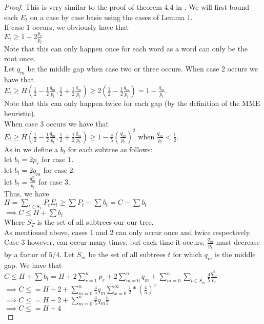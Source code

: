 \documentclass[letterpaper,12pt,titlepage,oneside,final]{book}
\theoremstyle{plain}
\begin{document}
\begin{proof}
This is very similar to the proof of theorem 4.4 in \cite{bayer1975improved}.
We will first bound each $E_t$ on a case by case basis using the cases of Lemma 1.\\
If case 1 occurs, we obviously have that \\
$E_t \geq 1-2 \frac{p_r}{p_t}$ \\
Note that this can only happen once for each word as a word can only be the root once. \\

Let $q_m$ be the middle gap when case two or three occurs. When case 2 occurs we have that \\
$E_t \geq H(\frac{1}{2}-\frac{1}{2} \frac{q_m}{p_t}, \frac{1}{2} + \frac{1}{2} \frac{q_m}{p_t}) \geq 2(\frac{1}{2}-\frac{1}{2} \frac{q_m}{p_t})=1-\frac{q_m}{p_t}$. \\
Note that this can only happen twice for each gap (by the definition of the MME heuristic). \\

When case 3 occurs we have that \\
$E_t \geq H(\frac{1}{2}-\frac{1}{2} \frac{q_m}{p_t}, \frac{1}{2} + \frac{1}{2} \frac{q_m}{p_t}) \geq 1- \frac{4}{5} (\frac{q_m}{p_t})^2$ when $\frac{q_m}{p_t} < \frac{1}{2}$. \\

As in \cite{bayer1975improved} we define a $b_t$ for each subtree as follows: \\
let $b_t=2p_r$ for case 1. \\
let $b_t=2q_m$ for case 2. \\
let $b_t=\frac{q_m^2}{p_t}$ for case 3. \\
Thus, we have \cite{bayer1975improved} \\
$H = \sum\limits_{t \in S_T} P_t E_t \geq \sum P_t - \sum b_t = C - \sum b_t$ \\
$ \implies C \leq H + \sum b_t$ \\ 
Where $S_T$ is the set of all subtrees our our tree. \\

As mentioned above, cases 1 and 2 can only occur once and twice respectively. Case 3 however, can occur many times, but each time it occurs, $\frac{q_m}{p_t}$ must decrease by a factor of $5/4$. Let $S_m$ be the set of all subtrees $t$ for which $q_m$ is the middle gap. We have that \\
$C \leq H + \sum b_t = H + 2 \sum\limits_{r = 1}^n p_r + 2 \sum\limits_{m = 0}^n q_m + \sum\limits_{m = 0}^n \sum\limits_{t \in S_m} \frac{4}{5}\frac{q_m^2}{p_t}$ \\
$\implies C \leq = H + 2 + \sum\limits_{m = 0}^n \frac{4}{5} q_m \sum\limits_{x=0}^{\infty} \frac{1}{2} * (\frac{4}{5}) ^ x$ \\
$\implies C \leq = H + 2 + \sum\limits_{m = 0}^n \frac{4}{5}q_m \frac{5}{2}$ \\
$\implies C \leq = H + 4$ \\

\end{proof}
\end{document}
